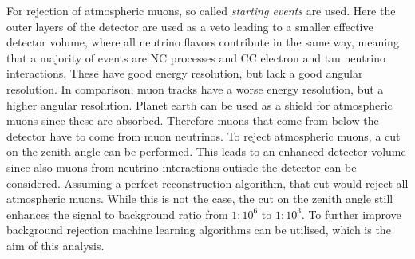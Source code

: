 For rejection of atmospheric muons, so called \textit{starting events} are used. Here the outer layers of the detector are used as a veto leading to a smaller effective detector volume, where all neutrino flavors contribute in the same way, meaning that a majority of events are NC processes and CC electron and tau neutrino interactions. These have good energy resolution, but lack a good angular resolution. In comparison, muon tracks have a worse energy resolution, but a higher angular resolution.
Planet earth can be used as a shield for atmospheric muons since these are absorbed. Therefore muons that come from below the detector have to come from muon neutrinos.
To reject atmospheric muons, a cut on the zenith angle can be performed. This leads to an enhanced detector volume since also muons from neutrino interactions outisde the detector can be considered. Assuming a perfect reconstruction algorithm, that cut would reject all atmospheric muons. While this is not the case, the cut on the zenith angle still enhances the signal to background ratio from $1 : 10^6$ to $1 : 10^3$. To further improve background rejection machine learning algorithms can be utilised, which is the aim of this analysis.
